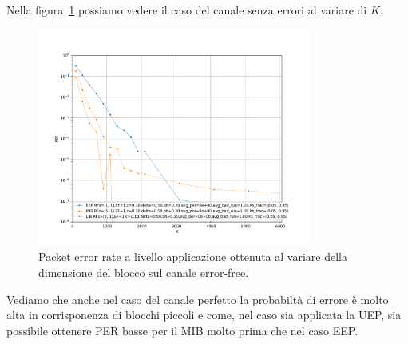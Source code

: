 \documentclass[italian, a4paper, 12pt]{article}
\begin{document}
Nella figura~\ref{fig:markov_zero} possiamo vedere il caso del canale
senza errori al variare di $K$.
%
\begin{figure}[htb]
  \centering
  \includegraphics[width=0.8\textwidth]{plot_markov_zero}
  \caption{Packet error rate a livello applicazione ottenuta al
    variare della dimensione del blocco sul canale error-free.}
  \label{fig:markov_zero}
\end{figure}
%
Vediamo che anche nel caso del canale perfetto la probabiltà di errore
è molto alta in corrisponenza di blocchi piccoli e come, nel caso sia
applicata la UEP, sia possibile ottenere PER basse per il MIB molto
prima che nel caso EEP.
\end{document}
